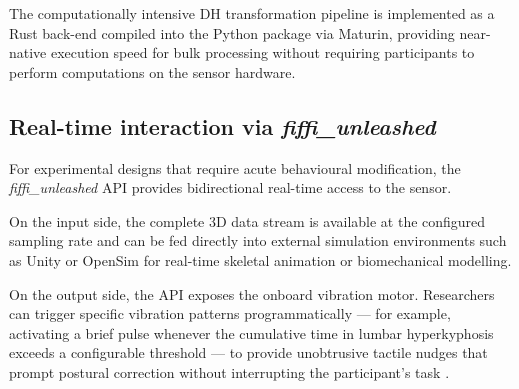 The computationally intensive \ac{DH} transformation pipeline is implemented as a
Rust back-end compiled into the Python package via Maturin, providing near-native
execution speed for bulk processing without requiring participants to perform
computations on the sensor hardware.

\subsection{Real-time interaction via \emph{fiffi\_unleashed}}

For experimental designs that require acute behavioural modification, the
\emph{fiffi\_unleashed} API provides bidirectional real-time access to the sensor.

On the input side, the complete 3D data stream is available at the configured
sampling rate and can be fed directly into external simulation environments such as
Unity or OpenSim for real-time skeletal animation or biomechanical modelling.

On the output side, the API exposes the onboard vibration motor.
Researchers can trigger specific vibration patterns programmatically --- for example,
activating a brief pulse whenever the cumulative time in lumbar hyperkyphosis exceeds
a configurable threshold --- to provide unobtrusive tactile nudges that prompt
postural correction without interrupting the participant's task \cite{walkling2025}.
